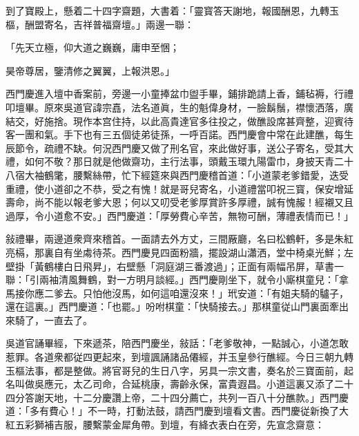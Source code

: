 到了寶殿上，懸着二十四字齋題，大書着：「靈寳答天謝地，報國酬恩，九轉玉樞，酬盟寄名，吉祥普福齋壇。」兩邊一聯：

\begin{myquote}
「先天立極，仰大道之巍巍，庸申至悃；

昊帝尊居，鑒清修之翼翼，上報洪恩。」
\end{myquote}

西門慶進入壇中香案前，旁邊一小童捧盆巾盥手畢，鋪排跪請上香，鋪毡褥，行禮叩壇畢。原來吳道官諱宗嚞，法名道眞，生的魁偉身材，一臉鬍鬚，襟懷洒落，廣結交，好施捨。現作本宫住持，以此高貴達官多往投之，做醮設席甚齊整，迎賓待客一團和氣。手下也有三五個徒弟徒孫，一呼百諾。西門慶會中常在此建醮，每生辰節令，疏禮不缺。何況西門慶又做了刑名官，來此做好事，送公子寄名，受其大禮，如何不敬？那日就是他做齋功，主行法事，頭戴玉環九陽雷巾，身披天青二十八宿大袖鶴氅，腰繫絲帶，忙下經筵來與西門慶稽首道：「小道蒙老爹錯愛，迭受重禮，使小道卻之不恭，受之有愧！就是哥兒寄名，小道禮當叩祝三寳，保安增延壽命，尚不能以報老爹大恩；何以又叨受老爹厚賞許多厚禮，誠有愧赧！經襯又且過厚，令小道愈不安。」西門慶道：「厚勞費心辛苦，無物可酬，薄禮表情而已！」

敍禮畢，兩邊道衆齊來稽首。一面請去外方丈，三間厰廳，名曰松鶴軒，多是朱紅亮槅，那裏自有坐䖏待茶。西門慶見四面粉牆，擺設湖山瀟洒，堂中椅桌光鮮；左壁掛「黃鶴樓白日飛昇」，右壁懸「洞庭湖三番渡過」；正面有兩幅吊屏，草書一聯：「引兩袖清風舞鶴，對一方明月談經。」西門慶剛坐下，就令小廝棋童兒：「拿馬接你應二爹去。只怕他沒馬，如何這咱還沒來！」玳安道：「有姐夫騎的驢子，還在這裏。」西門慶道：「也罷。」吩咐棋童：「快騎接去。」那棋童従山門裏面牽出來騎了，一直去了。

吳道官誦畢經，下來遞茶，陪西門慶坐，敍話：「老爹敬神，一點誠心，小道怎敢惹罪。各道衆都従四更起來，到壇諷誦諸品僊經，并玉皇參行醮經。今日三朝九轉玉樞法事，都是整做。將官哥兒的生日八字，另具一宗文書，奏名於三寶面前，起名叫做吳應元，太乙司命，合延桃康，壽齡永保，富貴遐昌。小道這裏又添了二十四分答謝天地，十二分慶讚上帝，二十四分薦亡，共列一百八十分醮款。」西門慶道：「多有費心！」不一時，打動法鼓，請西門慶到壇看文書。西門慶従新換了大紅五彩獅補吉服，腰繫蒙金犀角帶。到壇，有絳衣表白在旁，先宣念齋意：


